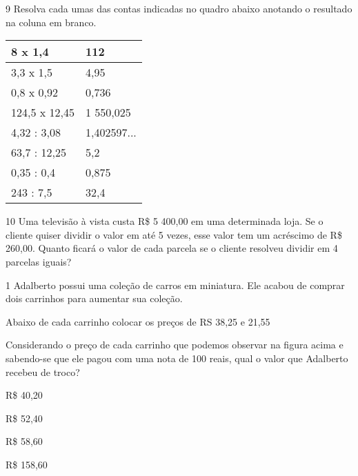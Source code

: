 {\num{9} Resolva cada umas das contas indicadas no quadro abaixo anotando o
resultado na coluna em branco.

\begin{longtable}[]{@{}ll@{}}
\toprule
8 x 1,4 & 112\tabularnewline
\midrule
\endhead
3,3 x 1,5 & 4,95\tabularnewline
0,8 x 0,92 & 0,736\tabularnewline
124,5 x 12,45 & 1 550,025\tabularnewline
4,32 : 3,08 & 1,402597...\tabularnewline
63,7 : 12,25 & 5,2\tabularnewline
0,35 : 0,4 & 0,875\tabularnewline
243 : 7,5 & 32,4\tabularnewline
\bottomrule
\end{longtable}

\num{10} Uma televisão à vista custa R\$ 5 400,00 em uma determinada loja.
Se o cliente quiser dividir o valor em até 5 vezes, esse valor tem um
acréscimo de R\$ 260,00. Quanto ficará o valor de cada parcela se o
cliente resolveu dividir em 4 parcelas iguais?




\num{1} Adalberto possui uma coleção de carros em miniatura. Ele acabou de
comprar dois carrinhos para aumentar sua coleção.



Abaixo de cada carrinho colocar os preços de RS 38,25 e 21,55

Considerando o preço de cada carrinho que podemos observar na figura
acima e sabendo-se que ele pagou com uma nota de 100 reais, qual o valor
que Adalberto recebeu de troco?

\begin{escolha}
\item
  R\$ 40,20
\item
  R\$ 52,40
\item
  R\$ 58,60
\item
  R\$ 158,60
\end{escolha}

}
